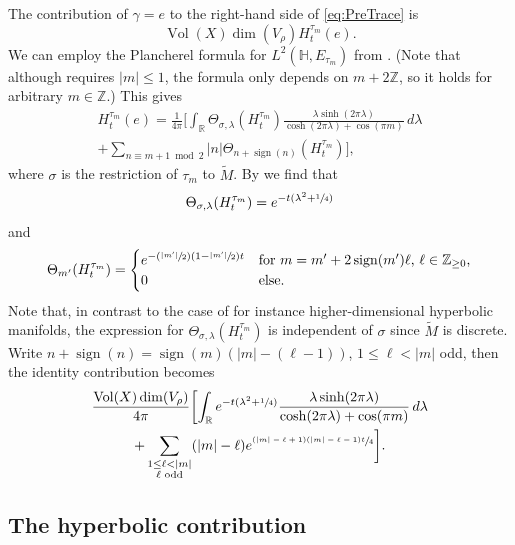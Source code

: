 \documentclass[10pt]{amsart}
\newcommand{\Psfrac}[2]{(\sfrac{#1}{#2})}
\theoremstyle{plain}
\theoremstyle{definition}
\theoremstyle{remark}
\newcommand{\R}{\mathbb{R}}
\newcommand{\Z}{\mathbb{Z}}
\renewcommand{\H}{\mathbb{H}}
\DeclareMathOperator{\Vol}{Vol}
\DeclareMathOperator{\sign}{sign}
\numberwithin{equation}{section}
\begin{document}
The contribution of $\gamma=e$ to the right-hand side of \cref{eq:PreTrace} is
\[
\Vol(X)\dim(V_\rho)H_t^{\tau_m}(e).
\]
We can employ the Plancherel formula for $L^2(\H,E_{\tau_m})$ from \cite[Lem.\,5]{Hof94}. (Note that although \cite[Lem.\,5]{Hof94} requires $|m|\leq1$, the formula only depends on $m+2\Z$, so it holds for arbitrary $m\in\Z$.) This gives
\begin{multline*}
H_t^{\tau_m}(e) = \frac{1}{4\pi}\bigg[\int_\R \Theta_{\sigma,\lambda}(H_t^{\tau_m})\frac{\lambda\sinh(2\pi\lambda)}{\cosh(2\pi\lambda)+\cos(\pi m)}\,d\lambda\\[-5pt]
+ \sum_{n\equiv m+1\bmod2}|n|\Theta_{n+\sign(n)}(H_t^{\tau_m})\bigg],
\end{multline*}
where $\sigma$ is the restriction of $\tau_m$ to $\widetilde{M}$. By \cite[p.\,2634]{MPf} we find that
\begin{equation}
\Theta_{\sigma,\lambda}(H_t^{\tau_m}) = e^{-t(\lambda^2+\sfrac{1}{4})}\label{eq:PSCharacterHeatKernel}
\end{equation}
and
\begin{equation}
\Theta_{m'}(H_t^{\tau_m}) = \begin{cases}e^{-\Psfrac{|m'|}{2}(1-\sfrac{|m'|}{2})t}&\mbox{for $m=m'+2\sign(m')\ell$, $\ell\in\Z_{\geq0}$,}\\0&\mbox{else.}\end{cases}\label{eq:DSCharacterHeatKernel}
\end{equation}
Note that, in contrast to the case of for instance higher-dimensional hyperbolic manifolds, the expression for $\Theta_{\sigma,\lambda}(H_t^{\tau_m})$ is independent of $\sigma$ since $\widetilde{M}$ is discrete. Write $n+\sign(n)=\sign(m)(|m|-(\ell-1))$, $1\leq\ell<|m|$ odd, then the identity contribution becomes
\begin{multline*}
\frac{\Vol(X)\dim(V_\rho)}{4\pi}\biggl[\int_\R e^{-t(\lambda^2+\sfrac{1}{4})}\frac{\lambda\sinh(2\pi\lambda)}{\cosh(2\pi\lambda)+\cos(\pi m)}\,d\lambda\\
+ \sum_{\substack{1\leq\ell<|m|\\\ell\textup{ odd}}}(|m|-\ell)e^{\sfrac{(|m|-\ell+1)(|m|-\ell-1)t}{4}}\biggr].
\end{multline*}

\subsection{The hyperbolic contribution}
\label{subsec:hyp}
\end{document}
